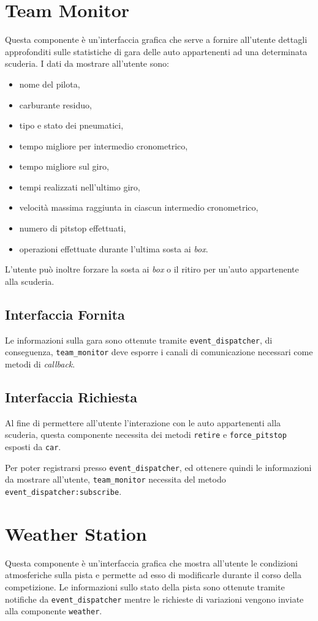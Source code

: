 \documentclass[a4paper]{report}
\newcommand{\fun}[1]{\texttt{#1}}
\begin{document}
\section{Team Monitor}
Questa componente è un'interfaccia grafica che serve a fornire all'utente dettagli approfonditi sulle statistiche di gara delle auto appartenenti ad una determinata scuderia.
I dati da mostrare all'utente sono:
\begin{itemize}
\item nome del pilota,
\item carburante residuo,
\item tipo e stato dei pneumatici,
\item tempo migliore per intermedio cronometrico,
\item tempo migliore sul giro,
\item tempi realizzati nell'ultimo giro,
\item velocità massima raggiunta in ciascun intermedio cronometrico,
\item numero di pitstop effettuati,
\item operazioni effettuate durante l'ultima sosta ai \textit{box}.
\end{itemize}
L'utente può inoltre forzare la sosta ai \textit{box} o il ritiro per un'auto appartenente alla scuderia.

\subsection*{Interfaccia Fornita}
Le informazioni sulla gara sono ottenute tramite \texttt{event\_dispatcher}, di conseguenza, \texttt{team\_monitor} deve esporre i canali di comunicazione necessari come metodi di \textit{callback}.
\subsection*{Interfaccia Richiesta}
Al fine di permettere all'utente l'interazione con le auto appartenenti alla scuderia, questa componente necessita dei metodi \fun{retire} e \fun{force\_pitstop} esposti da \texttt{car}.

Per poter registrarsi presso \texttt{event\_dispatcher}, ed ottenere quindi le informazioni da mostrare all'utente, \texttt{team\_monitor} necessita del metodo \fun{event\_dispatcher:subscribe}.

\section{Weather Station}
Questa componente è un'interfaccia grafica che mostra all'utente le condizioni atmosferiche sulla pista e permette ad esso di modificarle durante il corso della competizione. Le informazioni sullo stato della pista sono ottenute tramite notifiche da \texttt{event\_dispatcher} mentre le richieste di variazioni vengono inviate alla componente \texttt{weather}.
\end{document}
